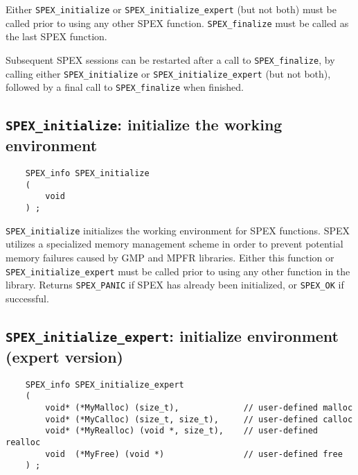 \documentclass[12pt]{report}
\theoremstyle{definition}
\begin{document}
Either \verb|SPEX_initialize| or \verb|SPEX_initialize_expert| (but not both)
must be called prior to using any other SPEX function.  \verb|SPEX_finalize|
must be called as the last SPEX function.

Subsequent SPEX sessions can be restarted after a call to
\verb|SPEX_finalize|, by calling either \verb|SPEX_initialize| or
\verb|SPEX_initialize_expert| (but not both), followed by a final call to
\verb|SPEX_finalize| when finished.

\newpage
\cprotect\subsection{\verb|SPEX_initialize|: initialize the working environment}

\begin{mdframed}[userdefinedwidth=6in]
{\footnotesize
\begin{verbatim}
    SPEX_info SPEX_initialize
    (
        void
    ) ;
\end{verbatim}
} \end{mdframed}

\verb|SPEX_initialize| initializes the working environment for SPEX
functions.  SPEX utilizes a specialized memory management scheme in order to
prevent potential memory failures caused by GMP and MPFR libraries.  Either
this function or \verb|SPEX_initialize_expert| must be called prior to using
any other function in the library.  Returns \verb|SPEX_PANIC| if SPEX has
already been initialized, or \verb|SPEX_OK| if successful.

\cprotect\subsection{\verb|SPEX_initialize_expert|: initialize environment
(expert version)}\label{ss:SPEX_initialize_expert}

\begin{mdframed}[userdefinedwidth=6in]
{\footnotesize
\begin{verbatim}
    SPEX_info SPEX_initialize_expert
    (
        void* (*MyMalloc) (size_t),             // user-defined malloc
        void* (*MyCalloc) (size_t, size_t),     // user-defined calloc
        void* (*MyRealloc) (void *, size_t),    // user-defined realloc
        void  (*MyFree) (void *)                // user-defined free
    ) ;
\end{verbatim}
} \end{mdframed}
\end{document}
